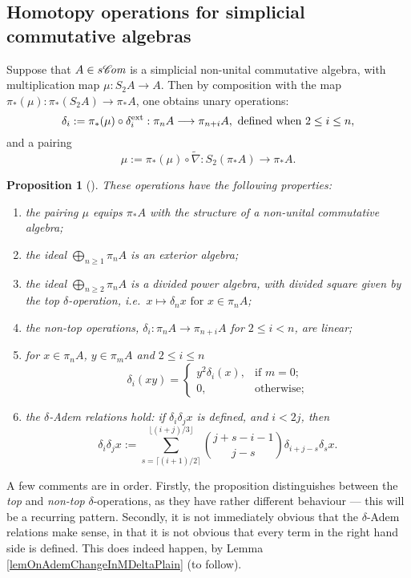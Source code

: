 \documentclass[11pt]{amsart} \renewcommand{\baselinestretch}{1.2}
\theoremstyle{plain}
\newtheorem{prop}[thm]{Proposition}
\numberwithin{equation}{section} %
\theoremstyle{plain}
\newtheorem{prop}[thm]{Proposition}
\numberwithin{equation}{chapter} %
\renewcommand{\to}{\longrightarrow}
\newcommand{\squishlist}{
}
\newcommand{\scrC}{\mathscr{C}}
\newcommand{\algs}{{\scrC\!\textit{\normalfont\textit{om}}}}
\renewcommand{\mapsto}{\longmapsto}
\newcommand{\SubsectionOrSection}[1]{\subsection{#1}}
\begin{document}
\begin{Constructing homotopy operations}
\SubsectionOrSection{Homotopy operations for simplicial commutative algebras}\label{Homotopy operations for simplicial commutative algebras}
Suppose that $A\in s \algs$ is a simplicial non-unital commutative algebra, with multiplication map $\mu:S_2A\to A$. Then by composition with the map $\pi_*(\mu):\pi_*(S_2A)\to \pi_*A$, one obtains unary operations:
\[\delta_i:=\pi_*(\mu)\circ\delta_i^\textup{ext}:\pi_nA\to \pi_{n+i}A,\textup{ defined when }2\leq i\leq n,\]
and a pairing\[\mu:=\pi_*(\mu)\circ\widetilde{\nabla}:S_2(\pi_*A)\to \pi_{*}A.\]
\begin{prop}[{\cite{DwyerHtpyOpsSimpComAlg.pdf}}]
\label{omnibus on htpy of simp algs}
These operations have the following properties:
\begin{enumerate}\squishlist
\item the pairing $\mu$ equips $\pi_*A$ with  the structure of a non-unital commutative algebra;
\item the ideal $\bigoplus_{n\geq1}\pi_nA$ is an exterior algebra;
\item the ideal $\bigoplus_{n\geq2}\pi_nA$ is a divided power algebra, with divided square given by the \emph{top $\delta$-operation}, i.e.\ $x\mapsto \delta_nx\text{ for }x\in\pi_nA$;
\item the \emph{non-top operations}, $\delta_i:\pi_nA\to \pi_{n+i}A$ for $2\leq i<n$, are linear;
\item for $x\in\pi_nA$, $y\in \pi_mA$ and $2\leq i\leq n$
\[\delta_i(xy)=\begin{cases}
y^2\delta_i(x),&\text{if }m=0;\\
0,&\text{otherwise};
\end{cases}
\]
\item \label{deltaademsunstable} the \emph{$\delta$-Adem relations} hold: if $\delta_i\delta_jx$ is defined, and $i<2j$, then
\[\delta_i\delta_jx:=\sum_{s=\lceil(i+1)/2\rceil}^{\lfloor(i+j)/3\rfloor}\binom{j+s-i-1}{ j-s}\delta_{i+j-s}\delta_sx.\]
\end{enumerate}
\end{prop}
\noindent A few comments are in order. Firstly, the proposition distinguishes between the \emph{top} and \emph{non-top} $\delta$-operations, as they have rather different behaviour --- this will be a recurring pattern. Secondly, it is not immediately obvious that the $\delta$-Adem relations make sense, in that it is not obvious that every term in the right hand side is defined. This does indeed happen, by Lemma \ref{lemOnAdemChangeInMDeltaPlain} (to follow). 


\end{Constructing homotopy operations}
\end{document}
